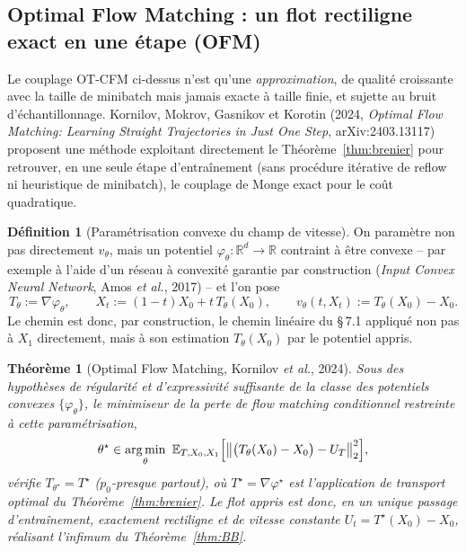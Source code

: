 \documentclass[11pt,a4paper]{article}
\theoremstyle{definition}
\newtheorem{definition}{Définition}[section]
\theoremstyle{plain}
\newtheorem{theoreme}{Théorème}[section]
\theoremstyle{remark}
\newcommand{\R}{\mathbb{R}}
\newcommand{\E}{\mathbb{E}}
\DeclareMathOperator*{\argmin}{arg\,min}
\begin{document}
\subsection{Optimal Flow Matching : un flot rectiligne exact en une étape (OFM)}\label{ssec:ofm}

Le couplage OT-CFM ci-dessus n'est qu'une \emph{approximation}, de qualité
croissante avec la taille de minibatch mais jamais exacte à taille finie, et
sujette au bruit d'échantillonnage. Kornilov, Mokrov, Gasnikov et Korotin (2024,
\emph{Optimal Flow Matching: Learning Straight Trajectories in Just One Step},
arXiv:2403.13117) proposent une méthode exploitant directement le
Théorème~\ref{thm:brenier} pour retrouver, en une seule étape d'entraînement
(sans procédure itérative de \og reflow \fg{} ni heuristique de minibatch), le
couplage de Monge exact pour le coût quadratique.

\begin{definition}[Paramétrisation convexe du champ de vitesse]
On paramètre non pas directement $v_\theta$, mais un potentiel
$\varphi_\theta:\R^d\to\R$ contraint à être convexe -- par exemple à l'aide d'un
réseau à convexité garantie par construction (\emph{Input Convex Neural
Network}, Amos \emph{et al.}, 2017) -- et l'on pose
\[
  T_\theta := \nabla\varphi_\theta,
  \qquad
  X_t := (1-t)X_0 + t\,T_\theta(X_0),
  \qquad
  v_\theta(t,X_t) := T_\theta(X_0)-X_0.
\]
Le chemin est donc, par construction, le chemin linéaire du \S\,7.1
appliqué non pas à $X_1$ directement, mais à son estimation $T_\theta(X_0)$ par
le potentiel appris.
\end{definition}

\begin{theoreme}[Optimal Flow Matching, {Kornilov \emph{et al.}, 2024}]\label{thm:ofm}
Sous des hypothèses de régularité et d'expressivité suffisante de la classe des
potentiels convexes $\{\varphi_\theta\}$, le minimiseur de la perte de flow
matching conditionnel restreinte à cette paramétrisation,
\[
  \theta^\star \in \argmin_\theta\ \E_{T,X_0,X_1}\Bigl[\bigl\|\bigl(T_\theta(X_0)-X_0\bigr) - U_T\bigr\|_2^2\Bigr],
\]
vérifie $T_{\theta^\star}=T^\star$ ($p_0$-presque partout), où $T^\star=\nabla\varphi^\star$
est l'application de transport optimal du Théorème~\ref{thm:brenier}. Le flot
appris est donc, en un unique passage d'entraînement, exactement rectiligne et
de vitesse constante $U_t=T^\star(X_0)-X_0$, réalisant l'infimum du
Théorème~\ref{thm:BB}.
\end{theoreme}
\end{document}
